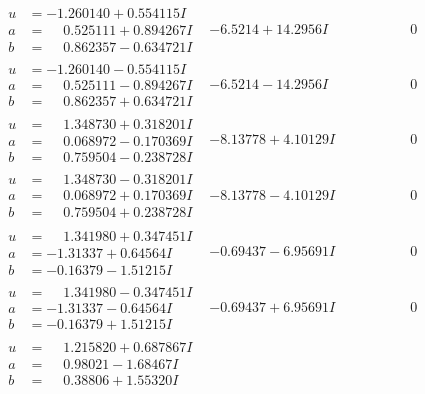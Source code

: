 \documentclass[1p]{elsarticle_modified}
\theoremstyle{definition}
\begin{document}
$$\begin{array}{c|c|c}
 \hline 
\begin{aligned}
u &= -1.260140 + 0.554115 I \\
a &= \phantom{-}0.525111 + 0.894267 I \\
b &= \phantom{-}0.862357 - 0.634721 I\end{aligned}
 & -6.5214 + 14.2956 I & \phantom{-0.000000 } 0 \\ \hline\begin{aligned}
u &= -1.260140 - 0.554115 I \\
a &= \phantom{-}0.525111 - 0.894267 I \\
b &= \phantom{-}0.862357 + 0.634721 I\end{aligned}
 & -6.5214 - 14.2956 I & \phantom{-0.000000 } 0 \\ \hline\begin{aligned}
u &= \phantom{-}1.348730 + 0.318201 I \\
a &= \phantom{-}0.068972 - 0.170369 I \\
b &= \phantom{-}0.759504 - 0.238728 I\end{aligned}
 & -8.13778 + 4.10129 I & \phantom{-0.000000 } 0 \\ \hline\begin{aligned}
u &= \phantom{-}1.348730 - 0.318201 I \\
a &= \phantom{-}0.068972 + 0.170369 I \\
b &= \phantom{-}0.759504 + 0.238728 I\end{aligned}
 & -8.13778 - 4.10129 I & \phantom{-0.000000 } 0 \\ \hline\begin{aligned}
u &= \phantom{-}1.341980 + 0.347451 I \\
a &= -1.31337 + 0.64564 I \\
b &= -0.16379 - 1.51215 I\end{aligned}
 & -0.69437 - 6.95691 I & \phantom{-0.000000 } 0 \\ \hline\begin{aligned}
u &= \phantom{-}1.341980 - 0.347451 I \\
a &= -1.31337 - 0.64564 I \\
b &= -0.16379 + 1.51215 I\end{aligned}
 & -0.69437 + 6.95691 I & \phantom{-0.000000 } 0 \\ \hline\begin{aligned}
u &= \phantom{-}1.215820 + 0.687867 I \\
a &= \phantom{-}0.98021 - 1.68467 I \\
b &= \phantom{-}0.38806 + 1.55320 I\end{aligned}

\end{array}$$
\end{document}
